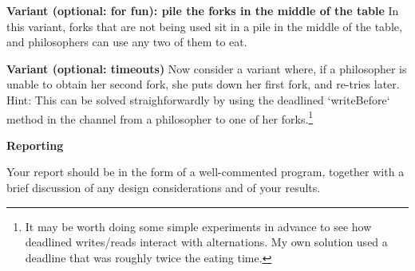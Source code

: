 \documentclass{../csopractical}
\def\Var#1{\textbf{#1}\newline}
\begin{document}

\Var{Variant (optional: for fun): pile the forks in the middle of the table} 
In this variant, forks that are not being used sit in a pile in the middle of
the table, and philosophers can use any two of them to eat.

\Var{Variant (optional: timeouts)} Now consider a
variant where, if a philosopher is unable to obtain her
second fork, she puts down her first fork, and re-tries
later. Hint: This can be solved straighforwardly by using
the deadlined `writeBefore` method in the channel from a
philosopher to one of her forks.\footnote{It may be worth doing some
simple experiments in advance to see how deadlined writes/reads interact 
with alternations. My own solution used a deadline that was roughly twice 
the eating time.} 



\Var{Reporting}

Your report should be in the form of a well-commented program, together with
a brief discussion of any design considerations and of your results.
\end{document}
